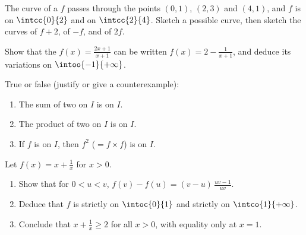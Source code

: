 \begin{exercise}[$\star\star$]\label{exo:g11:func:8}
The curve of a  $f$ passes through the points $(0, 1)$, $(2, 3)$
and $(4, 1)$, and $f$ is  on $\intcc{0}{2}$ and  on
$\intcc{2}{4}$. Sketch a possible curve, then sketch the curves of
$f + 2$, of $-f$, and of $2f$.
\end{exercise}

\begin{exercise}[$\star\star$]\label{exo:g11:func:9}
Show that the  $f(x) = \frac{2x+1}{x+1}$ can be written
$f(x) = 2 - \frac{1}{x+1}$, and deduce its variations on
$\intoo{-1}{+\infty}$.
\end{exercise}

\begin{exercise}[$\star\star$]\label{exo:g11:func:10}
True or false (justify or give a counterexample):
\begin{enumerate}
  \item The sum of two  on $I$ is  on $I$.
  \item The product of two  on $I$ is  on
        $I$.
  \item If $f$ is  on $I$, then $f^2$ ($= f \times f$) is
         on $I$.
\end{enumerate}
\end{exercise}

\begin{exercise}[$\star\star\star$]\label{exo:g11:func:11}
Let $f(x) = x + \frac{1}{x}$ for $x > 0$.
\begin{enumerate}
  \item Show that for $0 < u < v$,
        $f(v) - f(u) = (v - u)\,\frac{uv - 1}{uv}$.
  \item Deduce that $f$ is strictly  on $\intoc{0}{1}$ and
        strictly  on $\intco{1}{+\infty}$.
  \item Conclude that $x + \frac1x \geq 2$ for all $x > 0$, with equality
        only at $x = 1$.
\end{enumerate}
\end{exercise}

